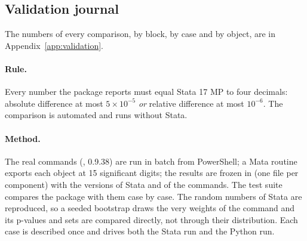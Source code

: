 \subsection{Validation journal}\label{note:valid}

The numbers of every comparison, by block, by case and by object, are in Appendix~\ref{app:validation}.

\paragraph{Rule.} Every number the package reports must equal Stata 17 MP to four decimals: absolute difference at most
$5\times10^{-5}$ \emph{or} relative difference at most $10^{-6}$. The comparison is automated and runs without Stata.

\paragraph{Method.} The real commands (,  0.9.38) are run in batch from PowerShell; a Mata
routine exports each object at 15 significant digits; the results are frozen in  (one file per
component) with the versions of Stata and of the commands. The test suite compares the package with them case by case.
The random numbers of Stata are reproduced, so a seeded bootstrap draws the very weights of the command and its
p-values and sets are compared directly, not through their distribution. Each case is described once and drives both the
Stata run and the Python run.

